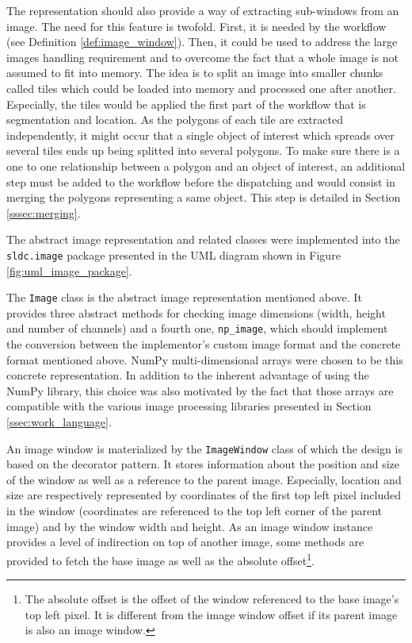 The representation should also provide a way of extracting sub-windows from an image. The need for this feature is twofold. First, it is needed by the workflow (see Definition \ref{def:image_window}). Then, it could be used to address the large images handling requirement and to overcome the fact that a whole image is not assumed to fit into memory. The idea is to split an image into smaller chunks called tiles which could be loaded into memory and processed one after another. Especially, the tiles would be applied the first part of the workflow that is segmentation and location. As the polygons of each tile are extracted independently, it might occur that a single object of interest which spreads over several tiles ends up being splitted into several polygons. To make sure there is a one to one relationship between a polygon and an object of interest, an additional step must be added to the workflow before the dispatching and would consist in merging the polygons representing a same object. This step is detailed in Section \ref{sssec:merging}.

The abstract image representation and related classes were implemented into the \texttt{sldc.image} package presented in the UML diagram shown in Figure \ref{fig:uml_image_package}.

The \texttt{Image} class is the abstract image representation mentioned above. It provides three abstract methods for checking image dimensions (width, height and number of channels) and a fourth one, \texttt{np\_image}, which should implement the conversion between the implementor's custom image format and the concrete format mentioned above. NumPy multi-dimensional arrays were chosen to be this concrete representation. In addition to the inherent advantage of using the NumPy library, this choice was also motivated by the fact that those arrays are compatible with the various image processing libraries presented in Section \ref{ssec:work_language}. 

An image window is materialized by the \texttt{ImageWindow} class of which the design is based on the decorator pattern. It stores information about the position and size of the window as well as a reference to the parent image. Especially, location and size are respectively represented by coordinates of the first top left pixel included in the window (coordinates are referenced to the top left corner of the parent image) and by the window width and height. As an image window instance provides a level of indirection on top of another image, some methods are provided to fetch the base image as well as the absolute offset\footnote{The absolute offset is the offset of the window referenced to the base image's top left pixel. It is different from the image window offset if its parent image is also an image window.}.

